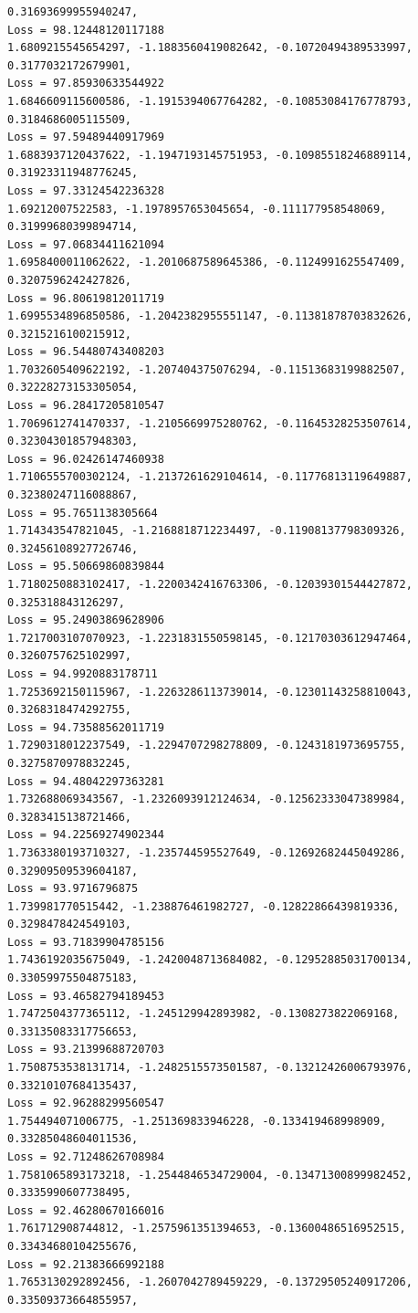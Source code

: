 \documentclass[11pt]{article}
\begin{document}
\begin{Verbatim}[commandchars=\\\{\}]
0.31693699955940247,
Loss = 98.12448120117188
1.6809215545654297, -1.1883560419082642, -0.10720494389533997,
0.3177032172679901,
Loss = 97.85930633544922
1.6846609115600586, -1.1915394067764282, -0.10853084176778793,
0.3184686005115509,
Loss = 97.59489440917969
1.6883937120437622, -1.1947193145751953, -0.10985518246889114,
0.31923311948776245,
Loss = 97.33124542236328
1.69212007522583, -1.1978957653045654, -0.111177958548069, 0.31999680399894714,
Loss = 97.06834411621094
1.6958400011062622, -1.2010687589645386, -0.1124991625547409,
0.3207596242427826,
Loss = 96.80619812011719
1.6995534896850586, -1.2042382955551147, -0.11381878703832626,
0.3215216100215912,
Loss = 96.54480743408203
1.7032605409622192, -1.207404375076294, -0.11513683199882507,
0.32228273153305054,
Loss = 96.28417205810547
1.7069612741470337, -1.2105669975280762, -0.11645328253507614,
0.32304301857948303,
Loss = 96.02426147460938
1.7106555700302124, -1.2137261629104614, -0.11776813119649887,
0.32380247116088867,
Loss = 95.7651138305664
1.714343547821045, -1.2168818712234497, -0.11908137798309326,
0.32456108927726746,
Loss = 95.50669860839844
1.7180250883102417, -1.2200342416763306, -0.12039301544427872,
0.325318843126297,
Loss = 95.24903869628906
1.7217003107070923, -1.2231831550598145, -0.12170303612947464,
0.3260757625102997,
Loss = 94.9920883178711
1.7253692150115967, -1.2263286113739014, -0.12301143258810043,
0.3268318474292755,
Loss = 94.73588562011719
1.7290318012237549, -1.2294707298278809, -0.1243181973695755,
0.3275870978832245,
Loss = 94.48042297363281
1.732688069343567, -1.2326093912124634, -0.12562333047389984,
0.3283415138721466,
Loss = 94.22569274902344
1.7363380193710327, -1.235744595527649, -0.12692682445049286,
0.32909509539604187,
Loss = 93.9716796875
1.739981770515442, -1.238876461982727, -0.12822866439819336, 0.3298478424549103,
Loss = 93.71839904785156
1.7436192035675049, -1.2420048713684082, -0.12952885031700134,
0.33059975504875183,
Loss = 93.46582794189453
1.7472504377365112, -1.245129942893982, -0.1308273822069168,
0.33135083317756653,
Loss = 93.21399688720703
1.7508753538131714, -1.2482515573501587, -0.13212426006793976,
0.33210107684135437,
Loss = 92.96288299560547
1.754494071006775, -1.251369833946228, -0.133419468998909, 0.33285048604011536,
Loss = 92.71248626708984
1.7581065893173218, -1.2544846534729004, -0.13471300899982452,
0.3335990607738495,
Loss = 92.46280670166016
1.761712908744812, -1.2575961351394653, -0.13600486516952515,
0.33434680104255676,
Loss = 92.21383666992188
1.7653130292892456, -1.2607042789459229, -0.13729505240917206,
0.33509373664855957,

\end{Verbatim}
\end{document}
